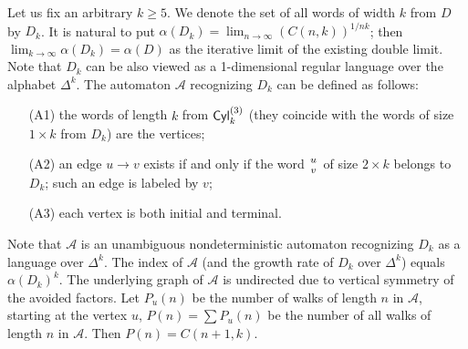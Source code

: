\documentclass[submission,copyright]{eptcs}\providecommand{\event}{WORDS 2011}
\def\A{{\mathcal A}}
\def\Cyl{{\sf Cyl}}
\begin{document}
Let us fix an arbitrary $k\ge5$. We denote the set of all words of width $k$ from $D$ by $D_k$. It is natural to put $\alpha(D_k)=\lim_{n\to\infty}\!{(C(n,k))^{1/nk}}$; then  $\lim_{k\to\infty}\alpha(D_k)=\alpha(D)$ as the iterative limit of the existing double limit. Note that $D_k$ can be also viewed as a 1-dimensional regular language over the alphabet $\Delta^k$. The automaton $\A$ recognizing $D_k$ can be defined as follows:
\begin{enumerate}
\item[(A1)] the words of length $k$ from $\Cyl_k^{(3)}$ (they coincide with the words of size $1\times k$ from $D_k$) are the vertices; 
\item[(A2)] an edge $u\to v$ exists if and only if the word $\genfrac{}{}{0pt}{}{u}{v}$ of size $2\times k$ belongs to $D_k$; such an edge is labeled by $v$; 
\item[(A3)] each vertex is both initial and terminal.
\end{enumerate}

Note that $\A$ is an unambiguous nondeterministic automaton recognizing $D_k$ as a language over $\Delta^k$. The index of $\A$ (and the growth rate of $D_k$ over $\Delta^k$) equals $\alpha(D_k)^k$. The underlying graph of $\A$ is undirected due to vertical symmetry of the avoided factors. Let $P_u(n)$ be the number of walks of length $n$ in $\A$, starting at the vertex $u$, $P(n)=\sum P_u(n)$ be the number of all walks of length $n$ in $\A$. Then $P(n)=C(n{+}1,k)$.
\end{document}
